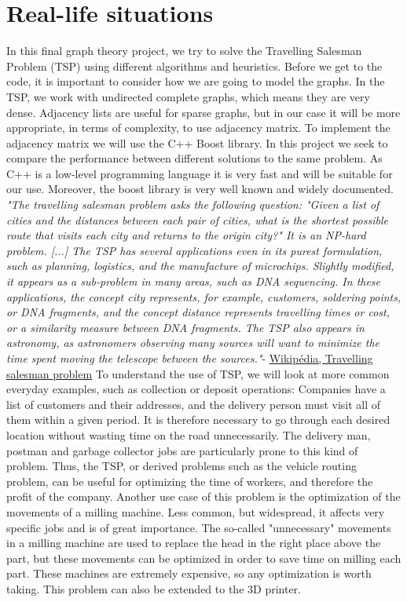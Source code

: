 \documentclass[a4paper, 12pt]{report}
\begin{document}
	\chapter{Real-life situations}
	\BlankLine
	In this final graph theory project, we try to solve the Travelling Salesman Problem (TSP) using different algorithms and heuristics.
	Before we get to the code, it is important to consider how we are going to model the graphs. In the TSP, we work with undirected complete graphs, which means they are very dense. Adjacency lists are useful for sparse graphs, but in our case it will be more appropriate, in terms of complexity, to use adjacency matrix. To implement the adjacency matrix we will use the C++ Boost library. In this project we seek to compare the performance between different solutions to the same problem. As C++ is a low-level programming language it is very fast and will be suitable for our use. Moreover, the boost library is very well known and widely documented.
	\BlankLine
	\textit{"The travelling salesman problem asks the following question: "Given a list of cities and the distances between each pair of cities, what is the shortest possible route that visits each city and returns to the origin city?" It is an NP-hard problem. [...]
	The TSP has several applications even in its purest formulation, such as planning, logistics, and the manufacture of microchips. Slightly modified, it appears as a sub-problem in many areas, such as DNA sequencing. In these applications, the concept city represents, for example, customers, soldering points, or DNA fragments, and the concept distance represents travelling times or cost, or a similarity measure between DNA fragments. The TSP also appears in astronomy, as astronomers observing many sources will want to minimize the time spent moving the telescope between the sources."}\BlankLine- \href{https://en.wikipedia.org/wiki/Travelling_salesman_problem}{Wikipédia, Travelling salesman problem}
	\BlankLine
	To understand the use of TSP, we will look at more common everyday examples, such as collection or deposit operations:
	Companies have a list of customers and their addresses, and the delivery person must visit all of them within a given period. It is therefore necessary to go through each desired location without wasting time on the road unnecessarily. The delivery man, postman and garbage collector jobs are particularly prone to this kind of problem. Thus, the TSP, or derived problems such as the vehicle routing problem, can be useful for optimizing the time of workers, and therefore the profit of the company.
	\BlankLine
	Another use case of this problem is the optimization of the movements of a milling machine. Less common, but widespread, it affects very specific jobs and is of great importance. The so-called "unnecessary" movements in a milling machine are used to replace the head in the right place above the part, but these movements can be optimized in order to save time on milling each part. These machines are extremely expensive, so any optimization is worth taking. This problem can also be extended to the 3D printer.
	
\end{document}
